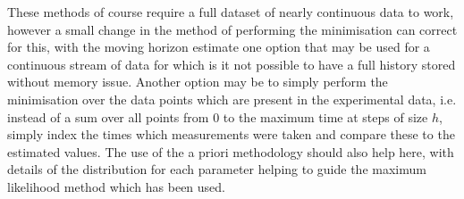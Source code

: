 These methods of course require a full dataset of nearly continuous data to work, however a small change in the method of performing the minimisation can correct for this, with the moving horizon estimate one option that may be used for a continuous stream of data for which is it not possible to have a full history stored without memory issue. Another option may be to simply perform the minimisation over the data points which are present in the experimental data, i.e. instead of a sum over all points from 0 to the maximum time at steps of size $h$, simply index the times which measurements were taken and compare these to the estimated values. The use of the a priori methodology should also help here, with details of the distribution for each parameter helping to guide the maximum likelihood method which has been used.
